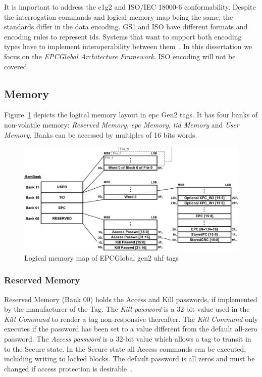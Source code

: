It is important to address the \ac{c1g2} and ISO/IEC 18000-6 conformability. Despite the interrogation commands and logical memory map being the same, the standards differ in the data encoding. 
GS1 and ISO have different formats and encoding rules to represent \acp{id}.
Systems that want to support both encoding types have to implement interoperability between them~\cite{mizutaniMulticodePortableRFID2016a}.
In this dissertation we focus on the \emph{EPCGlobal Architecture Framework}. ISO encoding will not be covered.

\subsection{Memory}

Figure~\ref{fig:logicalmemorymap} depicts the logical memory layout in \ac{epc} Gen2 tags. It has four banks of non-volatile memory: \emph{Reserved Memory}, \emph{\ac{epc} Memory}, \emph{\ac{tid} Memory} and \emph{User Memory}. Banks can be accessed by multiples of 16 bits words.

\begin{figure}[!ht]
    \centering
    \includegraphics[width=\textwidth]{./figs/02-state-of-the-art/logicmemorymap.pdf}
    \caption[Logical memory map of EPCGlobal \ac{gen2} \ac{uhf} tags]{Logical memory map of EPCGlobal \ac{gen2} \ac{uhf} tags~\cite{UHFGen2Tag}} 
    \label{fig:logicalmemorymap}
\end{figure}

\subsubsection{Reserved Memory}

Reserved Memory (Bank $00$) holds the Access and Kill passwords, if implemented by the manufacturer of the Tag. 
The \emph{Kill password} is a 32-bit value used in the \emph{Kill Command} to render a tag non-responsive thereafter. The \emph{Kill Command} only executes if the password has been set to a value different from the default all-zero password.
The \emph{Access password} is a 32-bit value which allows a tag to transit in to the Secure state. In the Secure state all Access commands can be executed, including writing to locked blocks. The default password is all zeros and must be changed if access protection is desirable~\cite{RFIDEPCGen2,UHFGen2Tag}.


